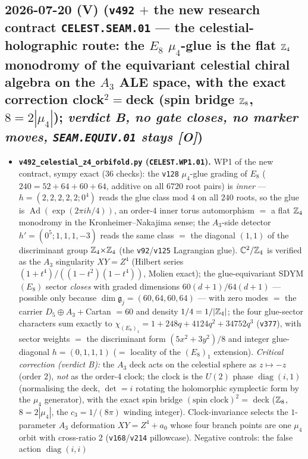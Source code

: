 \documentclass[11pt]{article}
\providecommand{\mO}{\textbf{[O]}}\providecommand{\mX}{\textbf{[X]}}
\providecommand{\cthree}{c_3}\providecommand{\phiz}{\varphi_0^{\mathrm{ret}}}
\begin{document}
\subsection*{2026-07-20 (V) (\texttt{v492} $+$ the new research contract \texttt{CELEST.SEAM.01} --- the celestial-holographic route: the $E_8$ $\mu_4$-glue is the flat $\mathbb{Z}_4$ monodromy of the equivariant celestial chiral algebra on the $A_3$ ALE space, with the exact correction clock$^2{=}$deck (spin bridge $\mathbb{Z}_8$, $8{=}2|\mu_4|$); \emph{verdict B, no gate closes, no marker moves, \texttt{SEAM.EQUIV.01} stays \mO})}
\begin{itemize}[leftmargin=1.5em]
\item \textbf{\texttt{v492\_celestial\_z4\_orbifold.py} (\texttt{CELEST.WP1.01}).} WP1 of the new contract,
sympy exact (36 checks): the \texttt{v128} $\mu_4$-glue grading of $E_8$ ($240=52{+}64{+}60{+}64$, additive on
all $6720$ root pairs) is \emph{inner} --- $h=(2,2,2,2,2;0^4)$ reads the glue class mod $4$ on all $240$
roots, so the glue is $\operatorname{Ad}(\exp(2\pi ih/4))$, an order-$4$ inner torus automorphism $=$ a flat
$\mathbb{Z}_4$ monodromy in the Kronheimer--Nakajima sense; the $A_3$-side detector $h'=(0^5;1,1,1,-3)$ reads the same class $=$ the diagonal
$(1,1)$ of the discriminant group $\mathbb{Z}_4{\times}\mathbb{Z}_4$ (the \texttt{v92}/\texttt{v125} Lagrangian glue).
$\mathbb C^2/\mathbb{Z}_4$ is verified as the $A_3$ singularity $XY{=}Z^4$ (Hilbert series
$(1{+}t^4)/((1{-}t^2)(1{-}t^4))$, Molien exact); the glue-equivariant SDYM$(E_8)$ sector \emph{closes} with
graded dimensions $60(d{+}1)/64(d{+}1)$ --- possible only because $\dim\mathfrak g_j=(60,64,60,64)$ --- with
zero modes $=$ the carrier $D_5{\oplus}A_3{+}$Cartan $=60$ and density $1/4=1/|\mathbb{Z}_4|$; the four glue-sector
characters sum exactly to $\chi_{(E_8)_1}=1{+}248q{+}4124q^2{+}34752q^3$ (\texttt{v377}), with sector weights
$=$ the discriminant form $(5x^2{+}3y^2)/8$ and integer glue-diagonal $h=(0,1,1,1)$ ($=$ locality of the
$(E_8)_1$ extension). \emph{Critical correction (verdict B):} the $A_3$ deck acts on the celestial sphere as
$z\mapsto-z$ (order $2$), \emph{not} as the order-$4$ clock; the clock is the $U(2)$ phase
$\operatorname{diag}(i,1)$ (normalising the deck, $\det=i$ rotating the holomorphic symplectic form by the
$\mu_4$ generator), with the exact spin bridge $(\text{spin clock})^2=$ deck ($\mathbb{Z}_8$, $8=2|\mu_4|$, the
$\cthree=1/(8\pi)$ winding integer). Clock-invariance selects the $1$-parameter $A_3$ deformation
$XY{=}Z^4{+}a_0$ whose four branch points are one $\mu_4$ orbit with cross-ratio $2$
(\texttt{v168}/\texttt{v214} pillowcase). Negative controls: the false action $\operatorname{diag}(i,i)$

\end{itemize}
\end{document}
